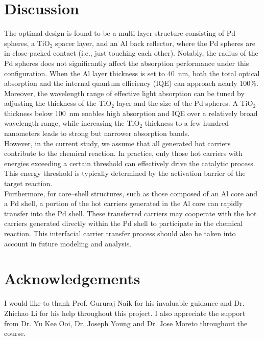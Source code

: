 \documentclass[journal]{IEEEtran}
\begin{document}
\section{Discussion}
\indent
The optimal design is found to be a multi-layer structure consisting of Pd spheres, a TiO$_2$ spacer layer, and an Al back reflector, where the Pd spheres are in close-packed contact (i.e., just touching each other). Notably, the radius of the Pd spheres does not significantly affect the absorption performance under this configuration. When the Al layer thickness is set to 40~nm, both the total optical absorption and the internal quantum efficiency (IQE) can approach nearly 100\%.\\
\indent
Moreover, the wavelength range of effective light absorption can be tuned by adjusting the thickness of the TiO$_2$ layer and the size of the Pd spheres. A TiO$_2$ thickness below 100~nm enables high absorption and IQE over a relatively broad wavelength range, while increasing the TiO$_2$ thickness to a few hundred nanometers leads to strong but narrower absorption bands.\\
\indent
However, in the current study, we assume that all generated hot carriers contribute to the chemical reaction. In practice, only those hot carriers with energies exceeding a certain threshold can effectively drive the catalytic process. This energy threshold is typically determined by the activation barrier of the target reaction.\\
\indent
Furthermore, for core–shell structures, such as those composed of an Al core and a Pd shell, a portion of the hot carriers generated in the Al core can rapidly transfer into the Pd shell. These transferred carriers may cooperate with the hot carriers generated directly within the Pd shell to participate in the chemical reaction. This interfacial carrier transfer process should also be taken into account in future modeling and analysis.\\

\section*{Acknowledgements}
I would like to thank Prof. Gururaj Naik for his invaluable guidance and Dr. Zhichao Li for his help throughout this project. I also appreciate the support from Dr. Yu Kee Ooi, Dr. Joseph Young and Dr. Jose Moreto throughout the course.\\



\end{document}
